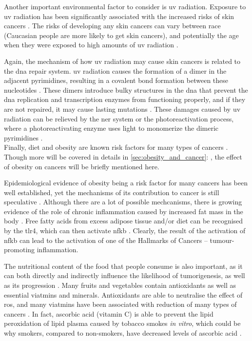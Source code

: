 \noindent
Another important environmental factor to consider is \gls{uv} radiation.
Exposure to \gls{uv} radiation has been significantly associated with the increased risks of skin cancers \citep{Armstrong2001,Gallagher2006}.
The risks of developing any skin cancers can vary between race (Caucasian people are more likely to get skin cancers), and potentially the age when they were exposed to high amounts of \gls{uv} radiation \citep{Armstrong2001,Gallagher2006}.

Again, the mechanism of how \gls{uv} radiation may cause  skin cancers is related to the \acrshort{dna} repair system.
\gls{uv} radiation causes the formation of a dimer in the adjacent pyrimidines, resulting in a covalent bond formation between these nucleotides \citep{Friedberg2003,Hoeijmakers2001}.
These dimers introduce bulky structures in the \acrshort{dna} that prevent the \acrshort{dna} replication and transcription enzymes from functioning properly, and if they are not repaired, it may cause lasting mutations \citep{Friedberg2003,Hoeijmakers2001}.
These damages caused by \gls{uv} radiation can be relieved by the \gls{ner} system or the photoreactivation process, where a photoreactivating enzyme uses light to monomerize the dimeric pyrimidines \citep{Friedberg2003}.
\\

\noindent
Finally, diet and obesity are known risk factors for many types of cancers \citep{Ames1995a,Calle2004}.
Though more will be covered in details in \cref{sec:obesity_and_cancer}: , the effect of obesity on cancers will be briefly mentioned here.

Epidemiological evidence of obesity being a risk factor for many cancers has been well established, yet the mechanisms of its contribution to cancer is still  speculative \citep{Calle2003,Kelesidis2006a}.
Although there are a lot of possible mechcanisms, there is growing evidence of the role of chronic inflammation caused by increased fat mass in the body \citep{Kelesidis2006a,Lumeng2011,Hernandez2013}.
Free fatty acids from excess adipose tissue and/or diet can be recognised by the \gls{tlr}4, which can then activate \gls{nfkb} \citep{Lumeng2011}.
Clearly, the result of the activation of \gls{nfkb} can lead to the activation of one of the Hallmarks of Cancers -- tumour-promoting inflammation.

The nutritional content of the food that people consume is also important, as it can both directly and indirectly influence the likelihood of tumorigenesis, as well as its progression \citep{Ames1995a}.
Many fruits and vegetables contain antioxidants as well as essential viatmins and minerals.
Antioxidants are able to neutralise the effect of \gls{ros},  and many viatmins have been associated with reduction of many types of cancers \citep{Ames1995a}.
In fact, ascorbic acid (vitamin C) is able to prevent the lipid peroxidation of lipid plasma caused by tobacco smokes \textit{in vitro}, which could be why smokers, compared to non-smokers, have decreased levels of ascorbic acid \citep{Hecht1999}.

